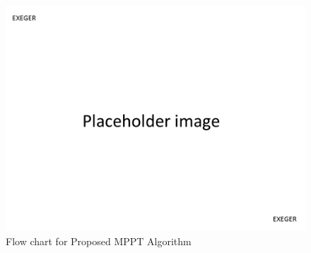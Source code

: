   
  \begin{figure}[H]
   \begin{center}
   \includegraphics[width=\textwidth]{images/pacehold}
   \caption{ Flow chart for Proposed MPPT Algorithm }
   \label{fig:cyflow}
   \end{center}
  \end{figure}


